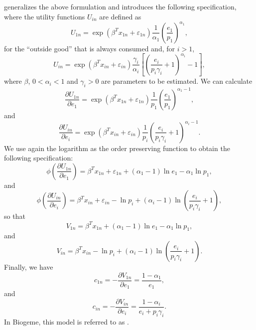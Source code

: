 \documentclass[12pt,a4paper]{article}
\begin{document}
 generalizes the above formulation and introduces the following specification, where the utility functions $U_{in}$ are defined as
\begin{equation}
  \label{eq:generalized_utility_outside}
U_{1n} =\exp(\beta^T x_{1n} + \varepsilon_{1n}) \frac{1}{\alpha_1} \left(\frac{e_1}{p_1}\right)^{\alpha_1},
\end{equation}
for the ``outside good'' that is always consumed and, for $i > 1$,
\begin{equation}
  \label{eq:generalized_utility}
U_{in} =\exp(\beta^T x_{in} + \varepsilon_{in}) \frac{\gamma_i}{\alpha_i} \left[\left(\frac{e_i}{p_i \gamma_i}+1\right)^{\alpha_i}-1\right],
\end{equation}
where $\beta$, $0 < \alpha_i < 1$ and $\gamma_i > 0$ are parameters to be
estimated. We can calculate
\begin{equation}
\frac{\partial U_{1n}}{\partial e_1} =\exp(\beta^T x_{1n} + \varepsilon_{1n}) \frac{1}{p_1} \left(\frac{e_1}{p_1}\right)^{\alpha_1-1},
\end{equation}
and
\begin{equation}
  \frac{\partial U_{in}}{\partial e_i} = \exp(\beta^T x_{in} + \varepsilon_{in}) \frac{1}{p_i} \left(\frac{e_i}{p_i \gamma_i}+1\right)^{\alpha_i-1}.
\end{equation}
We use again the logarithm as the order preserving function to obtain the following specification:
\[
\phi\left(\frac{\partial U_{1n}}{\partial e_1}\right) = \beta^T x_{1n} + \varepsilon_{1n} + (\alpha_1-1) \ln e_1 - \alpha_1 \ln p_1,
\]
and
\[
\phi\left(\frac{\partial U_{in}}{\partial e_i}\right) = \beta^T x_{in} + \varepsilon_{in} - \ln p_i + (\alpha_i-1) \ln \left(\frac{e_i}{p_i \gamma_i}+1\right),
\]
so that
\[
V_{1n} = \beta^T x_{1n} + (\alpha_1-1) \ln e_1 - \alpha_1 \ln p_1,
\]
and
\[
V_{in} = \beta^T x_{in} - \ln p_i + (\alpha_i-1) \ln \left(\frac{e_i}{p_i \gamma_i}+1\right).
\]
Finally, we have
\[
c_{1n} = -\frac{\partial V_{1n}}{\partial e_1} = \frac{1-\alpha_1}{e_1},
\]
and
\[
c_{in} = -\frac{\partial V_{in}}{\partial e_i} =\frac{1-\alpha_i}{e_i + p_i \gamma_i}.
\]
In Biogeme, this model is referred to as \lstinline@generalized@.
\end{document}
